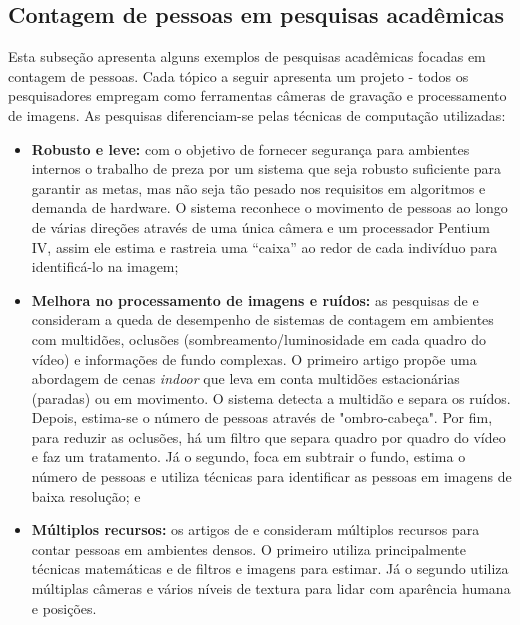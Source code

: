 \subsection{Contagem de pessoas em pesquisas acadêmicas}
 Esta subseção apresenta alguns exemplos de pesquisas acadêmicas focadas em contagem de pessoas. Cada tópico a seguir apresenta um projeto - todos os pesquisadores empregam como ferramentas câmeras de gravação e processamento de imagens. As pesquisas diferenciam-se pelas técnicas de computação utilizadas:

\begin{itemize}

  \item \textbf{Robusto e leve:} com o objetivo de fornecer segurança para ambientes internos o trabalho de  preza por um sistema que seja robusto suficiente para garantir as metas, mas não seja tão pesado nos requisitos em algoritmos e demanda de hardware. O sistema reconhece o movimento de pessoas ao longo de várias direções através de uma única câmera e um processador Pentium IV, assim ele estima e rastreia uma ``caixa'' ao redor de cada indivíduo para identificá-lo na imagem;

  \item \textbf{Melhora no processamento de imagens e ruídos:} as pesquisas de  e  consideram a queda de desempenho de sistemas de contagem em ambientes com multidões, oclusões (sombreamento/luminosidade em cada quadro do vídeo) e informações de fundo complexas. O primeiro artigo propõe uma abordagem de cenas \emph{indoor} que leva em conta multidões estacionárias (paradas) ou em movimento. O sistema detecta a multidão e separa os ruídos. Depois, estima-se o número de pessoas através de "ombro-cabeça". Por fim, para reduzir as oclusões, há um filtro que separa quadro por quadro do vídeo e faz um tratamento. Já o segundo, foca em subtrair o fundo, estima o número de pessoas e utiliza técnicas para identificar as pessoas em imagens de baixa resolução; e

  \item \textbf{Múltiplos recursos:} os artigos de  e  consideram múltiplos recursos para contar pessoas em ambientes densos. O primeiro utiliza principalmente técnicas matemáticas e de filtros e imagens para estimar. Já o segundo utiliza
  múltiplas câmeras e vários níveis de textura para lidar com aparência humana e posições.

\end{itemize}

